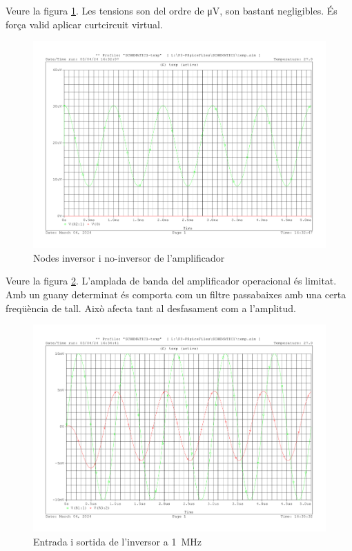 \documentclass[catalan, a4paper, nobib]{tufte-handout}
\begin{document}
 Veure la figura \ref{fig:q2}. Les tensions son del ordre de \unit{\micro\volt}, son bastant negligibles. És força valid aplicar curtcircuit virtual.
\begin{figure}[h]
    \begin{center}
        \includegraphics[width=\linewidth]{q2.pdf}
    \end{center}
    \caption{Nodes inversor i no-inversor de l'amplificador}
    \label{fig:q2}
\end{figure}

 Veure la figura \ref{fig:q3}. L'amplada de banda del amplificador operacional és limitat. Amb un guany determinat és comporta com un filtre passabaixes amb una certa freqüència de tall. Això afecta tant al desfasament com a l'amplitud.
\begin{figure}[h]
    \begin{center}
        \includegraphics[width=\linewidth]{q3.pdf}
    \end{center}
    \caption{Entrada i sortida de l'inversor a \qty{1}{\mega\hertz}}
    \label{fig:q3}
\end{figure}
\end{document}

